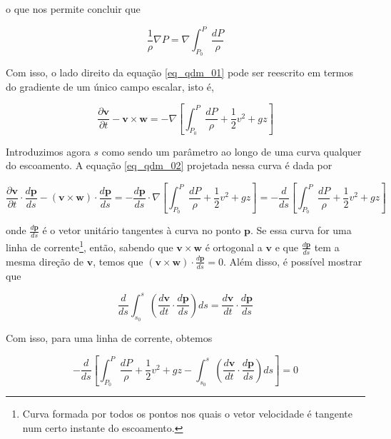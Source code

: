 \documentclass[a4paper,portuguese,10pt]{article}
\newcommand{\grad}{\nabla}
\renewcommand{\D}{\partial}
\renewcommand{\vec}{\mathbf}
\begin{document}
o que nos permite concluir que

\begin{equation}
  \frac{1}{\rho}\grad P = \grad\int_{P_0}^P\frac{dP}{\rho}
  \label{eq_press_per_dens_06}
\end{equation}

Com isso, o lado direito da equação \ref{eq_qdm_01} pode ser reescrito em termos do gradiente de um único campo escalar, isto é,

\begin{equation}
  \frac{\D\vec{v}}{\D t} -\vec{v}\times\vec{w} = -\grad\left[ \int_{P_0}^P\frac{dP}{\rho} + \frac{1}{2}v^2 + gz \right]
  \label{eq_qdm_02}
\end{equation}

Introduzimos agora $s$ como sendo um parâmetro ao longo de uma curva qualquer do escoamento. A equação \ref{eq_qdm_02} projetada nessa curva é dada por

\begin{equation}
  \frac{\D\vec{v}}{\D t}\cdot\frac{d\vec{p}}{ds} -(\vec{v}\times\vec{w})\cdot\frac{d\vec{p}}{ds} = -\frac{d\vec{p}}{ds}\cdot\grad\left[ \int_{P_0}^P\frac{dP}{\rho} + \frac{1}{2}v^2 + gz \right] = -\frac{d}{ds}\left[ \int_{P_0}^P\frac{dP}{\rho} + \frac{1}{2}v^2 + gz \right]
  \label{eq_qdm_03}
\end{equation}

onde $\frac{d\vec{p}}{ds}$ é o vetor unitário tangentes à curva no ponto $\vec{p}$. Se essa curva for uma linha de corrente\footnote{Curva formada por todos os pontos nos quais o vetor velocidade é tangente num certo instante do escoamento.}, então, sabendo que $\vec{v}\times\vec{w}$ é ortogonal a $\vec{v}$ e que $\frac{d\vec{p}}{ds}$ tem a mesma direção de $\vec{v}$, temos que $(\vec{v}\times\vec{w})\cdot\frac{d\vec{p}}{ds} = 0$. Além disso, é possível mostrar que

\begin{equation}
  \frac{d}{ds}\int_{s_0}^s\left(\frac{d\vec{v}}{dt}\cdot\frac{d\vec{p}}{ds}\right)ds = \frac{d\vec{v}}{dt}\cdot\frac{d\vec{p}}{ds}
\end{equation}

Com isso, para uma linha de corrente, obtemos

\begin{equation}
 -\frac{d}{ds}\left[ \int_{P_0}^P\frac{dP}{\rho} + \frac{1}{2}v^2 + gz - \int_{s_0}^s\left(\frac{d\vec{v}}{dt}\cdot\frac{d\vec{p}}{ds}\right)ds\right] = 0
  \label{eq_qdm_04}
\end{equation}
\end{document}
